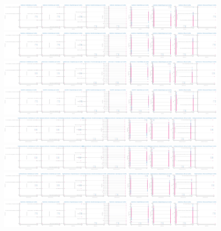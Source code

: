 \documentclass[10pt]{extarticle}
\begin{document}
\begin{figure}[H]
\includegraphics[scale=0.05]{images/dataset1/data_profiling/CovidPos_sparsity_HadStroke_per_class.png}
\includegraphics[scale=0.05]{images/dataset1/data_profiling/CovidPos_sparsity_HadAsthma_per_class.png}
\includegraphics[scale=0.05]{images/dataset1/data_profiling/CovidPos_sparsity_HadSkinCancer_per_class.png}
\includegraphics[scale=0.05]{images/dataset1/data_profiling/CovidPos_sparsity_HadCOPD_per_class.png}
\includegraphics[scale=0.05]{images/dataset1/data_profiling/CovidPos_sparsity_HadDepressiveDisorder_per_class.png}
\includegraphics[scale=0.05]{images/dataset1/data_profiling/CovidPos_sparsity_HadDepressiveDisorder_per_class.png}
\includegraphics[scale=0.05]{images/dataset1/data_profiling/CovidPos_sparsity_HadKidneyDisease_per_class.png}
\includegraphics[scale=0.05]{images/dataset1/data_profiling/CovidPos_sparsity_HadArthritis_per_class.png}

\end{figure}
\end{document}
